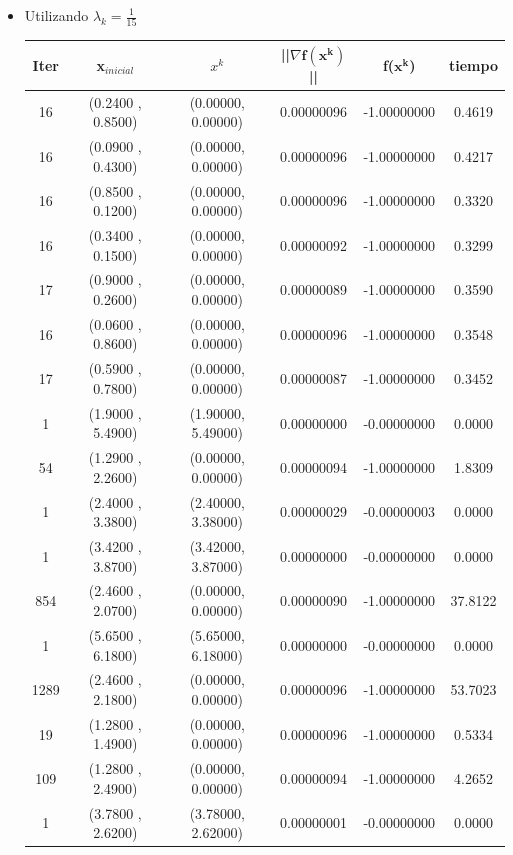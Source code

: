 \begin{itemize}
\item  Utilizando $\lambda_k = \frac{1}{15}$

\begin{table}[H]
\centering
\renewcommand{\arraystretch}{1.2} %
\begin{tabular}{|c|c|c|c|c|c|}
\hline
\textbf{Iter} & \textbf{x$_{inicial}$} & \textbf{$x^k$} & \textbf{||$\nabla \mathbf{f(x^k)}$}|| & \textbf{f($\mathbf{x^k}$)} & \textbf{tiempo} \\
\hline
16   & (0.2400 , 0.8500) & (0.00000, 0.00000) & 0.00000096 & -1.00000000 & 0.4619 \\
16   & (0.0900 , 0.4300) & (0.00000, 0.00000) & 0.00000096 & -1.00000000 & 0.4217 \\
16   & (0.8500 , 0.1200) & (0.00000, 0.00000) & 0.00000096 & -1.00000000 & 0.3320 \\
16   & (0.3400 , 0.1500) & (0.00000, 0.00000) & 0.00000092 & -1.00000000 & 0.3299 \\
17   & (0.9000 , 0.2600) & (0.00000, 0.00000) & 0.00000089 & -1.00000000 & 0.3590 \\
16   & (0.0600 , 0.8600) & (0.00000, 0.00000) & 0.00000096 & -1.00000000 & 0.3548 \\
17   & (0.5900 , 0.7800) & (0.00000, 0.00000) & 0.00000087 & -1.00000000 & 0.3452 \\
1   & (1.9000 , 5.4900) & (1.90000, 5.49000) & 0.00000000 & -0.00000000 & 0.0000 \\
54   & (1.2900 , 2.2600) & (0.00000, 0.00000) & 0.00000094 & -1.00000000 & 1.8309 \\
1   & (2.4000 , 3.3800) & (2.40000, 3.38000) & 0.00000029 & -0.00000003 & 0.0000 \\
1   & (3.4200 , 3.8700) & (3.42000, 3.87000) & 0.00000000 & -0.00000000 & 0.0000 \\
854   & (2.4600 , 2.0700) & (0.00000, 0.00000) & 0.00000090 & -1.00000000 & 37.8122 \\
1   & (5.6500 , 6.1800) & (5.65000, 6.18000) & 0.00000000 & -0.00000000 & 0.0000 \\
1289   & (2.4600 , 2.1800) & (0.00000, 0.00000) & 0.00000096 & -1.00000000 & 53.7023 \\
19   & (1.2800 , 1.4900) & (0.00000, 0.00000) & 0.00000096 & -1.00000000 & 0.5334 \\
109   & (1.2800 , 2.4900) & (0.00000, 0.00000) & 0.00000094 & -1.00000000 & 4.2652 \\
1   & (3.7800 , 2.6200) & (3.78000, 2.62000) & 0.00000001 & -0.00000000 & 0.0000 \\
\hline
\end{tabular}
\end{table}


\end{itemize}
